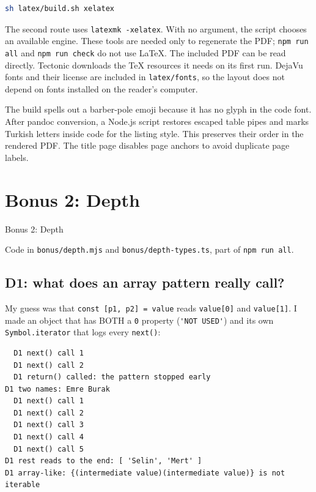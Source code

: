 \begin{lstlisting}[language=sh]
sh latex/build.sh xelatex
\end{lstlisting}

The second route uses \passthrough{\lstinline!latexmk -xelatex!}. With no argument, the script chooses an available engine.
These tools are needed only to regenerate the PDF; \passthrough{\lstinline!npm run all!} and \passthrough{\lstinline!npm run check!} do not use LaTeX.
The included PDF can be read directly. Tectonic downloads the TeX resources it needs on its first run.
DejaVu fonts and their license are included in \passthrough{\lstinline!latex/fonts!}, so the layout does not depend on
fonts installed on the reader's computer.

The build spells out a barber-pole emoji because it has no glyph in the code font.
After pandoc conversion, a Node.js script restores escaped table pipes and marks Turkish letters
inside code for the listing style. This preserves their order in the rendered PDF.
The title page disables page anchors to avoid duplicate page labels.

\section{Bonus 2: Depth}\label{bonus-2-depth}

Bonus 2: Depth

Code in \passthrough{\lstinline!bonus/depth.mjs!} and \passthrough{\lstinline!bonus/depth-types.ts!}, part of \passthrough{\lstinline!npm run all!}.

\subsection{D1: what does an array pattern really call?}\label{d1-what-does-an-array-pattern-really-call}

My guess was that \passthrough{\lstinline!const [p1, p2] = value!} reads \passthrough{\lstinline!value[0]!} and \passthrough{\lstinline!value[1]!}. I made an object that has BOTH a \passthrough{\lstinline!0!} property
(\passthrough{\lstinline!'NOT USED'!}) and its own \passthrough{\lstinline!Symbol.iterator!} that logs every \passthrough{\lstinline!next()!}:

\begin{lstlisting}
  D1 next() call 1
  D1 next() call 2
  D1 return() called: the pattern stopped early
D1 two names: Emre Burak
  D1 next() call 1
  D1 next() call 2
  D1 next() call 3
  D1 next() call 4
  D1 next() call 5
D1 rest reads to the end: [ 'Selin', 'Mert' ]
D1 array-like: {(intermediate value)(intermediate value)} is not iterable
\end{lstlisting}

